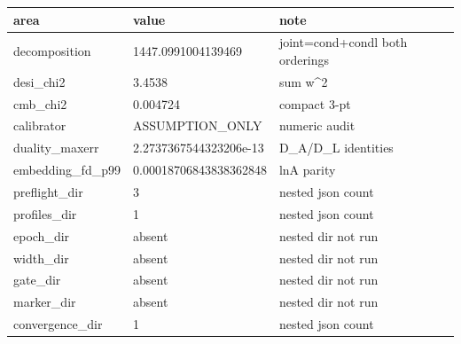 \begin{tabular}{lll}
\hline
area & value & note \\
\hline
decomposition & 1447.0991004139469 & joint=cond+condl both orderings \\
desi_chi2 & 3.4538 & sum w^2 \\
cmb_chi2 & 0.004724 & compact 3-pt \\
calibrator & ASSUMPTION_ONLY & numeric audit \\
duality_maxerr & 2.2737367544323206e-13 & D_A/D_L identities \\
embedding_fd_p99 & 0.00018706843838362848 & lnA parity \\
preflight_dir & 3 & nested json count \\
profiles_dir & 1 & nested json count \\
epoch_dir & absent & nested dir not run \\
width_dir & absent & nested dir not run \\
gate_dir & absent & nested dir not run \\
marker_dir & absent & nested dir not run \\
convergence_dir & 1 & nested json count \\
\hline
\end{tabular}
